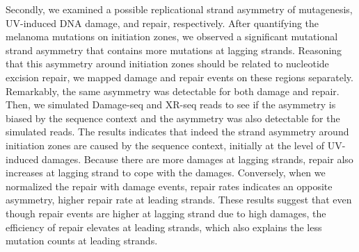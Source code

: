 Secondly, we examined a possible replicational strand asymmetry of mutagenesis, UV-induced DNA damage, and repair, respectively. After quantifying the melanoma mutations on initiation zones, we observed a significant mutational strand asymmetry that contains more mutations at lagging strands. Reasoning that this asymmetry around initiation zones should be related to nucleotide excision repair, we mapped damage and repair events on these regions separately. Remarkably, the same asymmetry was detectable for both damage and repair. Then, we simulated Damage-seq and XR-seq reads to see if the asymmetry is biased by the sequence context and the asymmetry was also detectable for the simulated reads. The results indicates that indeed the strand asymmetry around initiation zones are caused by the sequence context, initially at the level of UV-induced damages. Because there are more damages at lagging strands, repair also increases at lagging strand to cope with the damages. Conversely, when we normalized the repair with damage events, repair rates indicates an opposite asymmetry, higher repair rate at leading strands. These results suggest that even though repair events are higher at lagging strand due to high damages, the efficiency of repair elevates at leading strands, which also explains the less mutation counts at leading strands.         
